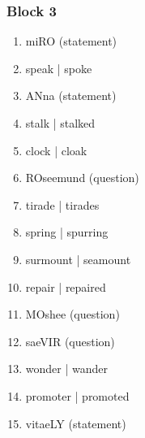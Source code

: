 \documentclass[a4paper]{article}
\begin{document}
\subsubsection{Block 3}
\begin{enumerate}

\item miRO (statement)
  \item speak | spoke
\item ANna (statement)
  \item stalk | stalked
  \item clock | cloak
\item ROseemund (question)
  \item tirade | tirades
  \item spring | spurring
  \item surmount | seamount
  \item repair | repaired
\item MOshee (question)
\item saeVIR (question)
  \item wonder | wander
  \item promoter | promoted
\item vitaeLY (statement)
\end{enumerate}
\end{document}
